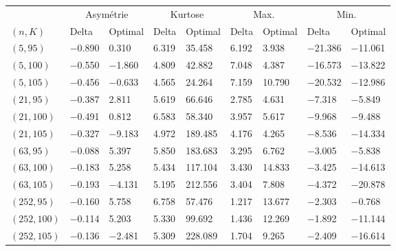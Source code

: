 \begin{tabular}{lllllllll}
\toprule
& \multicolumn{2}{c}{Asymétrie} & \multicolumn{2}{c}{Kurtose} & \multicolumn{2}{c}{Max.} & \multicolumn{2}{c}{Min.}\\
$(n,K)$& Delta & Optimal & Delta & Optimal & Delta & Optimal & Delta & Optimal\\
\midrule
$(5,95)$ & \num{-0.890} & \num{0.310} & \num{6.319} & \num{35.458} & \num{6.192} & \num{3.938} & \num{-21.386} & \num{-11.061}\\
$(5,100)$ & \num{-0.550} & \num{-1.860} & \num{4.809} & \num{42.882} & \num{7.048} & \num{4.387} & \num{-16.573} & \num{-13.822}\\
$(5,105)$ & \num{-0.456} & \num{-0.633} & \num{4.565} & \num{24.264} & \num{7.159} & \num{10.790} & \num{-20.532} & \num{-12.986}\\
$(21,95)$ & \num{-0.387} & \num{2.811} & \num{5.619} & \num{66.646} & \num{2.785} & \num{4.631} & \num{-7.318} & \num{-5.849}\\
$(21,100)$ & \num{-0.491} & \num{0.812} & \num{6.583} & \num{58.340} & \num{3.957} & \num{5.617} & \num{-9.968} & \num{-9.488}\\
$(21,105)$ & \num{-0.327} & \num{-9.183} & \num{4.972} & \num{189.485} & \num{4.176} & \num{4.265} & \num{-8.536} & \num{-14.334}\\
$(63,95)$ & \num{-0.088} & \num{5.397} & \num{5.850} & \num{183.683} & \num{3.295} & \num{6.762} & \num{-3.005} & \num{-5.838}\\
$(63,100)$ & \num{-0.183} & \num{5.258} & \num{5.434} & \num{117.104} & \num{3.430} & \num{14.833} & \num{-3.425} & \num{-14.613}\\
$(63,105)$ & \num{-0.193} & \num{-4.131} & \num{5.195} & \num{212.556} & \num{3.404} & \num{7.808} & \num{-4.372} & \num{-20.878}\\
$(252,95)$ & \num{-0.160} & \num{5.758} & \num{6.758} & \num{57.476} & \num{1.217} & \num{13.677} & \num{-2.303} & \num{-0.768}\\
$(252,100)$ & \num{-0.114} & \num{5.203} & \num{5.330} & \num{99.692} & \num{1.436} & \num{12.269} & \num{-1.892} & \num{-11.144}\\
$(252,105)$ & \num{-0.136} & \num{-2.481} & \num{5.309} & \num{228.089} & \num{1.704} & \num{9.265} & \num{-2.409} & \num{-16.614}\\
\bottomrule
\end{tabular}